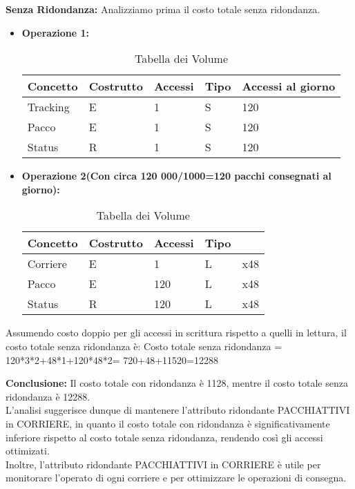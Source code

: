 \textbf{Senza Ridondanza:} Analizziamo prima il costo totale senza ridondanza.
\begin{itemize}
    \item \textbf{Operazione 1:} 
     \begin{center}
        \begin{table}[]
        \centering
        \begin{tabular} {|m{5em}|m{5em}|m{5em}|m{5em}|m{5em}|}
        \hline
        \textbf{Concetto} & \textbf{Costrutto} & \textbf{Accessi} & \textbf{Tipo} & \textbf{Accessi al giorno}\\ [0.5ex]
        \hline\hline
            Tracking & E & 1 & S & 120\\
            \hline
            Pacco & E & 1 & S & 120\\
            \hline
            Status & R & 1 & S & 120\\ 
            \hline
           \end{tabular}
            \caption{Tabella dei Volume}
    \end{table}
\end{center}
    \item \textbf{Operazione 2(Con circa 120 000/1000=120 pacchi consegnati al giorno):}
    \begin{center}
        \begin{table}[]
        \centering
        \begin{tabular} {|m{5em}|m{5em}|m{5em}|m{5em}|m{5em}|}
        \hline
        \textbf{Concetto} & \textbf{Costrutto} & \textbf{Accessi} & \textbf{Tipo}\\ [0.5ex]
        \hline\hline
            Corriere & E & 1 & L & x48\\
            \hline
            Pacco & E & 120 & L & x48\\
            \hline
            Status & R & 120 & L & x48\\ 
            \hline
           \end{tabular}
            \caption{Tabella dei Volume}
    \end{table}
\end{center}
\end{itemize}
Assumendo costo doppio per gli accessi in scrittura rispetto a quelli in lettura, il costo totale senza ridondanza è:
Costo totale senza ridondanza = 120*3*2+48*1+120*48*2= 720+48+11520=12288

\textbf{Conclusione:} Il costo totale con ridondanza è 1128, mentre il costo totale senza ridondanza è 12288.\\
L'analisi suggerisce dunque di mantenere l'attributo ridondante PACCHIATTIVI in CORRIERE, in quanto il costo totale con ridondanza è significativamente inferiore rispetto al costo totale senza ridondanza, rendendo così gli accessi ottimizati.\\
Inoltre, l'attributo ridondante PACCHIATTIVI in CORRIERE è utile per monitorare l'operato di ogni corriere e per ottimizzare le operazioni di consegna.\\




